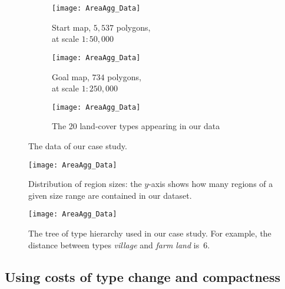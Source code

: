 \begin{figure}[tb]
\begin{subfigure}[b]{.49\textwidth}
\centering
\texttt{[image: AreaAgg\_Data]}
\caption{Start map, $5{,}537$ polygons, \\
	at scale $1:50{,}000$}
\end{subfigure}
\hfill
\begin{subfigure}[b]{.49\textwidth}
\centering
\texttt{[image: AreaAgg\_Data]}
\caption{Goal map, $734$ polygons, \\
	at scale $1:250{,}000$}
\end{subfigure}
%
\par\vspace{\baselineskip} %
%
\begin{subfigure}{\textwidth}
\centering
\texttt{[image: AreaAgg\_Data]}
\caption{The 20 land-cover types appearing in our data}
\end{subfigure}
\caption{The data of our case study.}
\label{fig:AreaAgg_Data}
\end{figure}

\begin{figure}[tb]
\centering
\texttt{[image: AreaAgg\_Data]}
\caption{Distribution of region sizes:
	the $y$-axis shows how many regions 
	of a given size range are contained in our dataset.}
\label{fig:AreaAgg_NumRegion}
\end{figure}

\begin{figure}[tb]
\centering
\texttt{[image: AreaAgg\_Data]}
\caption{The tree of type hierarchy used in our case study.
	For example, the distance between 
	types \emph{village} and \emph{farm land} is~$6$.}
\label{fig:AreaAgg_TypeDistances}
\end{figure}

\subsection{Using costs of type change and compactness}
\label{sec:AreaAgg_CaseStudy1}

